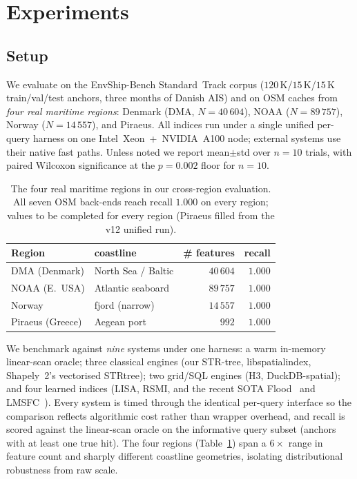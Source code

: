 \section{Experiments}\label{sec:bench}

\subsection{Setup}
We evaluate on the EnvShip-Bench Standard~Track corpus
($120$\,K/$15$\,K/$15$\,K train/val/test anchors, three months of Danish
AIS) and on OSM caches from \emph{four real maritime regions}: Denmark
(DMA, $N\!=\!40\,604$), NOAA ($N\!=\!89\,757$), Norway
($N\!=\!14\,557$), and Piraeus. All indices run under a single unified
per-query harness on one Intel~Xeon~+~NVIDIA~A100 node; external systems
use their native fast paths. Unless noted we report mean$\pm$std over
$n\!=\!10$ trials, with paired Wilcoxon significance at the $p\!=\!0.002$
floor for $n\!=\!10$. \begin{table}[t]
\centering
\caption{The four real maritime regions in our cross-region evaluation.
All seven OSM back-ends reach recall $1.000$ on every region; values to be
completed for every region (Piraeus filled from the v12 unified run).}\label{tab:datasets}
\small
\begin{tabular}{llrr}
\toprule
Region & coastline & \# features & recall \\
\midrule
DMA (Denmark)   & North Sea / Baltic & $40\,604$ & $1.000$ \\
NOAA (E.\ USA)  & Atlantic seaboard  & $89\,757$ & $1.000$ \\
Norway          & fjord (narrow)     & $14\,557$ & $1.000$ \\
Piraeus (Greece)& Aegean port        & $992$     & $1.000$ \\
\bottomrule
\end{tabular}
\end{table}

We benchmark against \emph{nine} systems under one harness: a warm
in-memory linear-scan oracle; three classical engines (our STR-tree,
libspatialindex, Shapely~2's vectorised STRtree); two grid/SQL engines
(H3, DuckDB-spatial); and four learned indices (LISA, RSMI, and the recent
SOTA Flood~\cite{nathan2020flood} and LMSFC~\cite{gao2022lmsfc}). Every
system is timed through the identical per-query interface so the comparison
reflects algorithmic cost rather than wrapper overhead, and recall is
scored against the linear-scan oracle on the informative query subset
(anchors with at least one true hit). The four regions
(Table~\ref{tab:datasets}) span a $6\times$ range in feature count and
sharply different coastline geometries, isolating distributional robustness
from raw scale.

